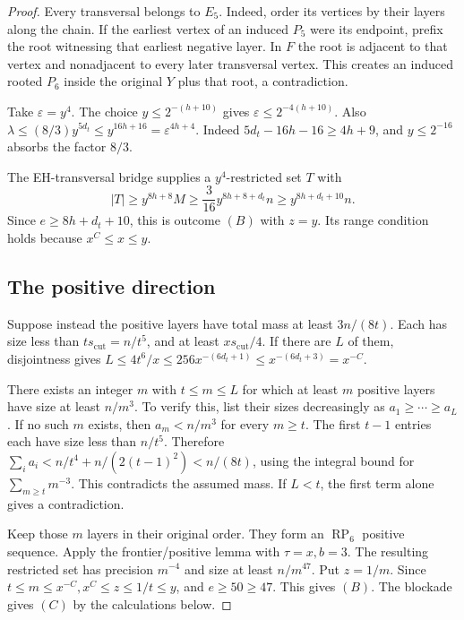 \documentclass[11pt,a4paper]{article}
\theoremstyle{definition}
\theoremstyle{remark}
\numberwithin{equation}{section}
\begin{document}
\begin{proof}
Every transversal belongs to \(E_{5}\). Indeed, order its vertices by their layers along the chain. If the earliest vertex of an induced \(P_{5}\) were its endpoint, prefix the root witnessing that earliest negative layer. In \(F\) the root is adjacent to that vertex and nonadjacent to every later transversal vertex. This creates an induced rooted \(P_{6}\) inside the original \(Y\) plus that root, a contradiction.

Take \(\varepsilon=y^{4}\). The choice \(y\le\allowbreak 2^{-(h+10)}\) gives \(\varepsilon\le\allowbreak 2^{-4(h+10)}\). Also \(\lambda \le\allowbreak  (8/3)y^{5d_{t}} \le\allowbreak  y^{16h+16}=\varepsilon^{4h+4}\). Indeed \(5d_{t}-16h-16\ge\allowbreak 4h+9\), and \(y\le\allowbreak 2^{-16}\) absorbs the factor \(8/3\).

The EH-transversal bridge supplies a \(y^4\)-restricted set \(T\) with
\[
 |T|\ge y^{8h+8}M\ge \frac{3}{16}y^{8h+8+d_t}n
 \ge y^{8h+d_t+10}n.
\]
Since \(e\ge8h+d_t+10\), this is outcome \((B)\) with \(z=y\). Its range condition holds because \(x^C\le x\le y\).
\subsection{The positive direction}\label{subsec:rp6-positive}
Suppose instead the positive layers have total mass at least \(3n/(8t)\). Each has size less than \(ts_{\mathrm{cut}}=n/t^{5}\), and at least \(xs_{\mathrm{cut}}/4\). If there are \(L\) of them, disjointness gives \(L \le\allowbreak 4t^{6}/x \le\allowbreak 256x^{-(6d_{t}+1)} \le\allowbreak x^{-(6d_{t}+3)}=x^{-C}\).

There exists an integer \(m\) with \(t\le\allowbreak m\le\allowbreak L\) for which at least \(m\) positive layers have size at least \(n/m^{3}\). To verify this, list their sizes decreasingly as \(a_{1}\ge\cdots\ge a_{L}\). If no such \(m\) exists, then \(a_{m}<n/m^{3}\) for every \(m\ge\allowbreak t\). The first \(t-1\) entries each have size less than \(n/t^{5}\). Therefore \(\sum _{i} a_{i} < n/t^{4} + n/(2(t-1)^{2}) < n/(8t)\), using the integral bound for \(\sum _{m\ge\allowbreak t}m^{-3}\). This contradicts the assumed mass. If \(L<t\), the first term alone gives a contradiction.

Keep those \(m\) layers in their original order. They form an \(\operatorname{RP}_{6}\) positive sequence. Apply the frontier/positive lemma with \(\tau=x,\allowbreak b=3\). The resulting restricted set has precision \(m^{-4}\) and size at least \(n/m^{47}\). Put \(z=1/m\). Since \(t\le\allowbreak m\le\allowbreak x^{-C},\allowbreak  x^{C}\le\allowbreak z\le\allowbreak 1/t\le\allowbreak y\), and \(e\ge\allowbreak 50\ge\allowbreak 47\). This gives \((B)\). The blockade gives \((C)\) by the calculations below.



\end{proof}
\end{document}
